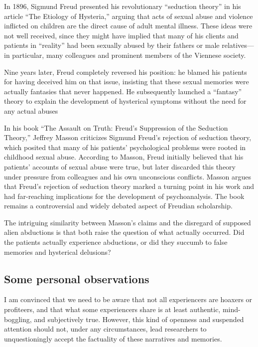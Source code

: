 In 1896, Sigmund Freud presented his revolutionary ``seduction theory''
in his article ``The Etiology of Hysteria,''
arguing that acts of sexual abuse and violence inflicted on children are the direct cause of adult mental illness.
These ideas were not well received, since they might have implied that many of his clients and patients
in ``reality'' had been sexually abused by their fathers or male relatives---in particular, many colleagues and prominent members of
the Viennese society.

Nine years later, Freud completely reversed his position:
he blamed his patients for having deceived him on that issue,
insisting that these sexual memories were actually fantasies that never happened.
He subsequently launched a ``fantasy'' theory to explain the development of hysterical
symptoms without the need for any actual abuses~\cite{Masson1984,Eisen2001Jan,Bogousslavsky_2014}

In his book ``The Assault on Truth: Freud's Suppression of the Seduction Theory,''
Jeffrey Masson criticizes Sigmund Freud's rejection of seduction theory,
which posited that many of his patients' psychological problems were rooted in childhood sexual abuse.
According to Masson, Freud initially believed that his patients' accounts of sexual abuse were true,
but later discarded this theory under pressure from colleagues and his own unconscious conflicts.
Masson argues that Freud's rejection of seduction theory marked a turning point in his work and had far-reaching implications for the development of psychoanalysis.
The book remains a controversial and widely debated aspect of Freudian scholarship.

The intriguing similarity between Masson's claims and the disregard of supposed alien abductions is that both raise the question of what actually occurred. Did the patients actually experience abductions,
or did they succumb to false memories and hysterical delusions?


\subsection{Some personal observations}

I am convinced that we need to be aware that not all experiencers are hoaxers or profiteers, and that what some experiencers share is at least authentic, mind-boggling, and subjectively true. However, this kind of openness and suspended attention should not, under any circumstances, lead researchers to unquestioningly accept the factuality of these narratives and memories.

